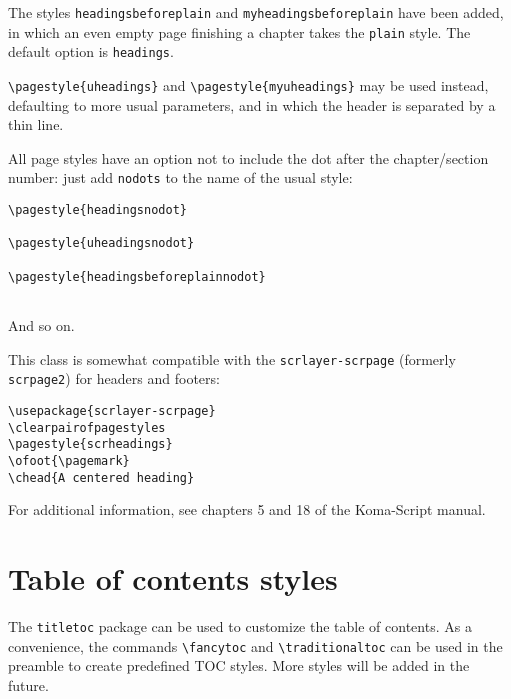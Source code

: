 \documentclass[withmarginpar,titleauthor,11pt]{mwart}
\begin{document}
The styles \verb+headingsbeforeplain+ and \verb+myheadingsbeforeplain+ have been added, in which an even empty page finishing a chapter takes the \verb|plain| style. The default option is \verb|headings|.


\verb|\pagestyle{uheadings}| and \verb|\pagestyle{myuheadings}| may be used instead, defaulting to more usual parameters, and in which the header is separated by a thin line.

All page styles have an option not to include the dot after the chapter/section number: just add \verb|nodots| to the name of the usual style:

\begin{verbatim}
\pagestyle{headingsnodot}

\pagestyle{uheadingsnodot}

\pagestyle{headingsbeforeplainnodot}
 
\end{verbatim}

And so on.


This class is somewhat compatible with the \verb|scrlayer-scrpage| (formerly \verb|scrpage2|) for headers and footers:

\begin{verbatim}
\usepackage{scrlayer-scrpage}
\clearpairofpagestyles
\pagestyle{scrheadings}
\ofoot{\pagemark}
\chead{A centered heading}
\end{verbatim}

For additional information, see chapters 5 and 18 of the Koma-Script manual.

\section{Table of contents styles}

The \texttt{titletoc} package can be used to customize the table of contents. As a convenience, the commands \verb|\fancytoc| and \verb|\traditionaltoc| can be used in the preamble to create predefined TOC styles. More styles will be added in the future.


%
\end{document}
